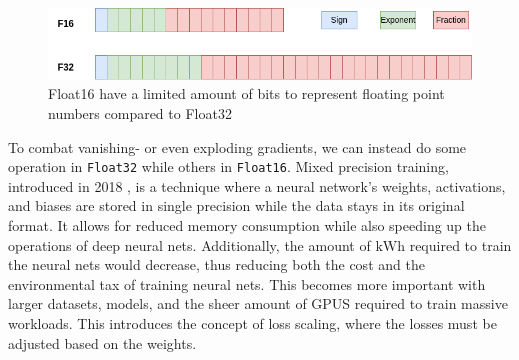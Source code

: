 \begin{figure}[!h]
    \centering
    \includegraphics[width=0.8\linewidth]{figures/floats.png}
    \caption{Float16 have a limited amount of bits to represent floating point numbers compared to Float32}
    \label{fig:floats}
\end{figure}

To combat vanishing- or even exploding gradients, we can instead do some operation in \texttt{Float32} while others in \texttt{Float16}. Mixed precision training, introduced in 2018 \cite{micikevicius2018mixed}, is a technique where a neural network's weights, activations, and biases are stored in single precision while the data stays in its original format. It allows for reduced memory consumption while also speeding up the operations of deep neural nets. Additionally, the amount of $\si{\kilo\watt\hour}$ required to train the neural nets would decrease, thus reducing both the cost and the environmental tax of training neural nets. This becomes more important with larger datasets, models, and the sheer amount of GPUS required to train massive workloads. This introduces the concept of loss scaling, where the losses must be adjusted based on the weights. \\

